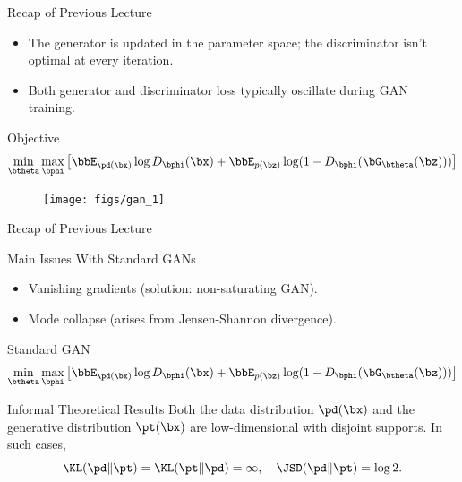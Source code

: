 \documentclass{beamer}
\begin{document}
\begin{frame}{Recap of Previous Lecture}
	\begin{itemize}
		\item The generator is updated in the parameter space; the discriminator isn't optimal at every iteration.
		\item Both generator and discriminator loss typically oscillate during GAN training.
	\end{itemize}
	\begin{block}{Objective}
		\vspace{-0.5cm}
		\[
		\min_{\btheta} \max_{\bphi} \left[ \bbE_{\pd(\bx)} \log D_{\bphi}(\bx) + \bbE_{p(\bz)} \log (1 - D_{\bphi}(\bG_{\btheta}(\bz))) \right]
		\]
		\vspace{-0.5cm}
	\end{block}
	\begin{figure}
		\centering
		\texttt{[image: figs/gan\_1]}
	\end{figure}
\end{frame}
\begin{frame}{Recap of Previous Lecture}
	\begin{block}{Main Issues With Standard GANs}
		\begin{itemize}
			\item Vanishing gradients (solution: non-saturating GAN).
			\item Mode collapse (arises from Jensen-Shannon divergence).
		\end{itemize}
	\end{block}
	\begin{block}{Standard GAN}
		\vspace{-0.2cm}
		\[
		\min_{\btheta} \max_{\bphi} \left[ \bbE_{\pd(\bx)} \log D_{\bphi}(\bx) + \bbE_{p(\bz)} \log (1 - D_{\bphi}(\bG_{\btheta}(\bz))) \right]
		\]
		\vspace{-0.4cm}
	\end{block}
	\vspace{-0.1cm}
	\begin{block}{Informal Theoretical Results}
		Both the data distribution $\pd(\bx)$ and the generative distribution $\pt(\bx)$ are low-dimensional with disjoint supports. In such cases,
		\[
			\KL(\pd \| \pt) = \KL(\pt \| \pd) = \infty, \quad \JSD(\pd \| \pt) = \log 2.
		\]
	\end{block}
\end{frame}
\end{document}
